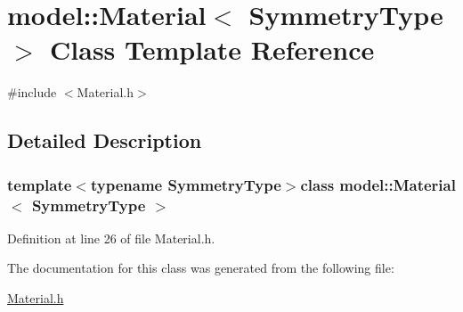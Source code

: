 \hypertarget{classmodel_1_1_material}{}\section{model\+:\+:Material$<$ Symmetry\+Type $>$ Class Template Reference}
\label{classmodel_1_1_material}


{\ttfamily \#include $<$Material.\+h$>$}



\subsection{Detailed Description}
\subsubsection*{template$<$typename Symmetry\+Type$>$class model\+::\+Material$<$ Symmetry\+Type $>$}



Definition at line 26 of file Material.\+h.



The documentation for this class was generated from the following file\+:\begin{DoxyCompactItemize}
\item 
\hyperlink{_material_8h}{Material.\+h}\end{DoxyCompactItemize}
